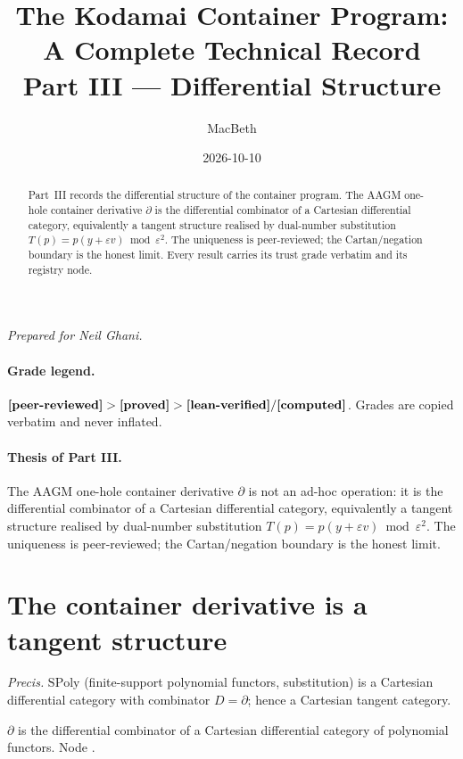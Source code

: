 \documentclass[11pt]{article}
\title{The Kodamai Container Program: A Complete Technical Record\\[4pt]
\large Part III --- Differential Structure}
\author{MacBeth}
\date{2026-10-10}
\begin{document}
\maketitle
\begin{center}\itshape Prepared for Neil Ghani.\end{center}

\begin{abstract}
Part~III records the differential structure of the container program. The AAGM one-hole container
derivative $∂$ is the differential combinator of a Cartesian differential category, equivalently a
tangent structure realised by dual-number substitution $T(p)=p(y+εv)\bmod ε^2$. The uniqueness is
peer-reviewed; the Cartan/negation boundary is the honest limit. Every result carries its trust
grade verbatim and its registry node.
\end{abstract}

\paragraph{Grade legend.}
$\textbf{[peer-reviewed]} > \textbf{[proved]} > \textbf{[lean-verified]} / \textbf{[computed]}$. Grades are
copied verbatim and never inflated.

\paragraph{Thesis of Part III.}
The AAGM one-hole container derivative $∂$ is not an ad-hoc operation: it is the differential
combinator of a Cartesian differential category, equivalently a tangent structure realised by
dual-number substitution $T(p)=p(y+εv)\bmod ε^2$. The uniqueness is peer-reviewed; the
Cartan/negation boundary is the honest limit.

\section{The container derivative is a tangent structure}
\emph{Precis.} $\mathrm{SPoly}$ (finite-support polynomial functors, substitution) is a Cartesian
differential category with combinator $D=∂$; hence a Cartesian tangent category.

\begin{theorem}
$∂$ is the differential combinator of a Cartesian differential category of polynomial functors.
Node .
\end{theorem}
\end{document}
